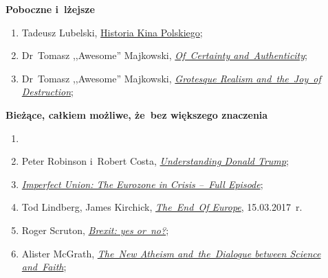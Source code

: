\documentclass[a4paper,11pt]{article}
\newcommand{\spaceOne}{1.5em}
\newcommand{\tb}{\textbf}
\newcommand{\Center}[1]{\begin{center} #1 \end{center}}
\newcommand{\CenterTB}[1]{\Center{\tb{#1}}}
\newcommand{\Field}[1]{ \begin{center} {\Large \tb{#1} } \end{center} }
\begin{document}
\CenterTB{Poboczne i~lżejsze}



\begin{enumerate}
\item Tadeusz Lubelski,
  \href{https://www.youtube.com/watch?v=bp47Zk2JN90\&index=1\&list=PLGVPA5rfUcppi-kSDESRjPwiNV4aPsQi7}
  {Historia Kina Polskiego};
\item Dr~Tomasz ,,Awesome'' Majkowski,
  \href{https://www.youtube.com/watch?v=4gM3LbnPBmc}
  {\emph{Of~Certainty and~Authenticity}};
\item Dr~Tomasz ,,Awesome'' Majkowski,
  \href{https://www.youtube.com/watch?v=nGN5_m_IxfY}{\emph{Grotesque
      Realism and~the~Joy~of Destruction}};
\end{enumerate}

\vspace{\spaceOne}



\Field{Bieżące, całkiem możliwe, że~bez większego znaczenia}



\begin{enumerate}
\item \item Peter Robinson i~Robert Costa,
  \href{https://www.youtube.com/watch?v=DYFvuBM-Vms}{\emph{Understanding
      Donald Trump}};
\item
  \href{https://www.youtube.com/watch?v=CxbB16SWq9g}{\emph{Imperfect
      Union: The Eurozone in Crisis --~Full Episode}};
\item Tod Lindberg, James Kirchick,
  \href{https://www.youtube.com/watch?v=ubFZVVHCY60}{\emph{The~End~Of
      Europe}}, 15.03.2017~r.
\item Roger Scruton,
  \href{https://www.youtube.com/watch?v=Bvlg8YK3iSU}{\emph{Brexit: yes
      or~no?}};
\item Alister McGrath,
  \href{https://www.youtube.com/watch?v=rb86hxwb_Yc}{\emph{The~New
      Atheism and~the~Dialogue between Science and~Faith}};
\end{enumerate}



 {}
\end{document}
